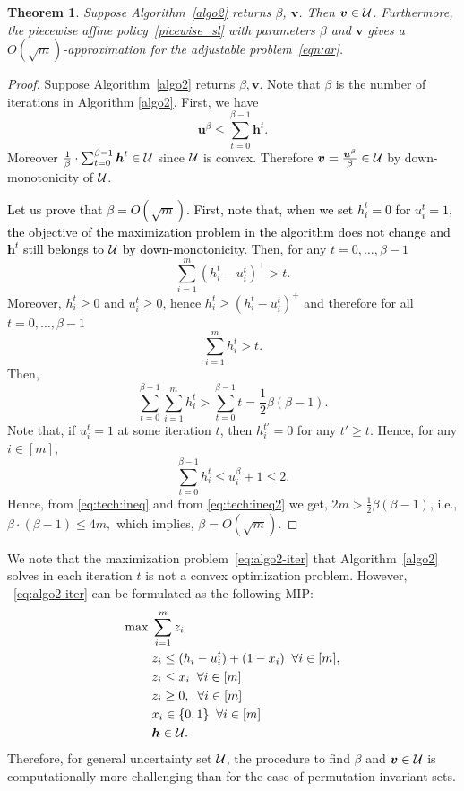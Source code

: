 \documentclass[11pt]{article}
\theoremstyle{plain}
\newtheorem{theorem}{Theorem}[section]
\theoremstyle{definition}
\numberwithin{equation}{section}%
\numberwithin{equation}{section}%
\newcommand{\mb}[1]{\ensuremath{\boldsymbol{#1}}}
\newcommand*{\red}{\textcolor{black}}
\begin{document}
\begin{theorem} \label{thm:bound:beta}
Suppose Algorithm~\ref{algo2} returns $\beta$, $\mb v$. Then $\mb v \in {\cal U}$. Furthermore, the piecewise affine policy~\eqref{picewise_sl} with parameters $\beta$ and $\mb v$ gives a $O(\sqrt m)$-approximation for the adjustable problem~\eqref{eqn:ar}.
\end{theorem}
\begin{proof}
Suppose Algorithm~\ref{algo2} returns $\beta, \mb v$. Note that $\beta$ is the number of iterations in Algorithm \ref{algo2}. First, we have
$$ \mb u^{\beta} \leq \sum_{t=0}^{\beta -1} \mb h^t .$$
Moreover $\frac{1}{\beta}\cdot \sum_{t=0}^{\beta -1} \mb h^t \in {\cal U}$ since ${\cal U}$ is convex. Therefore $ \mb v = \frac{\mb u^{\beta}}{\beta} \in {\cal U}$ by down-monotonicity of ${\cal U}$.

\red{Let us prove that $\beta =O ( \sqrt{m} )$. First, note that, when we set $h_i^t=0$ for $u_i^t=1$, the objective of the maximization problem in the algorithm does not change and $\mb h^t $ still belongs to $ {\cal U}$ by down-monotonicity}. Then, for any $ t=0, \ldots , \beta-1$
$$   \sum_{i=1}^m \left( h_{i}^t- u_i^t \right)^+ > t  .$$
Moreover, $h_i^t \geq 0 $ and $u_i^t \geq 0 $, hence $h_i^t \geq (h_i^t - u_i^t )^+$ and therefore for all  $t=	0,\ldots,\beta-1$
$$\sum_{i=1}^m  h_i^t >  t.$$
Then,
\begin{equation} \label{eq:tech:ineq}
\sum_{t=0}^{\beta-1} \sum_{i=1}^m  h_i^t >   \sum_{t=0}^{\beta-1}  t  =    \frac{1}{2}    \beta ( \beta -1 ) .
\end{equation}
Note that, if $u_i^t=1$ at some iteration $t$, then $h_i^{t'}=0$ for any $t' \geq t$. Hence, for any $i\in [m]$,
\begin{equation} \label{eq:tech:ineq2}
 \sum_{t=0}^{\beta-1}  h_i^t \leq   u_i^{\beta} +1 \leq 2 .
\end{equation}
Hence, from \eqref{eq:tech:ineq} and  from \eqref{eq:tech:ineq2} we get,
$ 2m >   \frac{1}{2}    \beta ( \beta -1 )$, i.e.,  $ \beta \cdot (\beta -1) \leq 4m ,$
which implies, $\beta = O ( \sqrt{m} ).$
 \end{proof}

We note that the maximization problem~\eqref{eq:algo2-iter} that Algorithm~\ref{algo2} solves in each iteration $t$ is not a convex optimization problem.  However, ~\eqref{eq:algo2-iter} can be formulated as the following MIP:
\begin{equation}\label{eqn:IP}
\begin{aligned}
\max \; & \sum_{i=1}^m z_i \\
&   z_i \leq (h_i-u_i^t) +(1-x_i) \; \; \forall i \in [m],     \\
& z_i \leq x_i \; \; \forall i \in [m]        \\
&  z_i \geq 0, \; \; \forall i \in [m]       \\
&  x_i \in \{0,1\} \; \; \forall i \in [m] \\
&\mb h \in{\cal U} .
\end{aligned}
\end{equation}
Therefore, for general uncertainty set ${\cal U}$, the procedure to find $\beta$ and $\mb v \in {\cal U}$ is computationally more challenging than for the case of permutation invariant sets.
\end{document}
